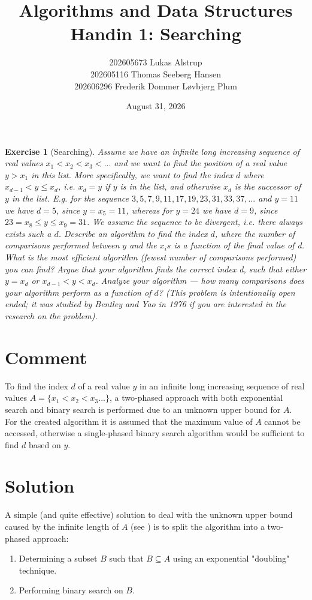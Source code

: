 \documentclass{article}
\title{Algorithms and Data Structures \\
  Handin 1: Searching}
\author{
    202605673 Lukas Alstrup \\
    202605116 Thomas Seeberg Hansen \\
    202606296 Frederik Dommer Løvbjerg Plum
}
\date{August 31, 2026}
\newtheorem*{exercise}{Exercise}
\begin{document}
\maketitle
\begin{exercise}[Searching]
	Assume we have an infinite long increasing sequence of real values $x_1 < x_2 < x_3 < ...$ and we want to find the position of a real value
	$y > x_1$ in this list. More specifically, we want to find the index $d$ where $x_{d - 1} < y \leq x_d$, i.e.
	$x_d = y$ if $y$ is in the list, and otherwise $x_d$ is the successor of $y$ in the list. E.g. for the sequence $3,
		5, 7, 9, 11, 17, 19, 23, 31, 33, 37, ...$ and $y = 11$ we have $d = 5$, since $y = x_5 = 11$, whereas for $y = 24$
	we have $d = 9$, since $23 = x_8 \leq y \leq x_9 = 31$. We assume the sequence to be divergent, i.e. there
	always exists such a $d$.
	Describe an algorithm to find the index $d$, where the number of comparisons performed
	between $y$ and the $x_is$ is a function of the final value of d. What is the most efficient algorithm
	(fewest number of comparisons performed) you can find? Argue that your algorithm finds the
	correct index d, such that either $y = x_d$ or $x_{d - 1} < y < x_d$. Analyze your algorithm — how many
	comparisons does your algorithm perform as a function of $d$?
	(This problem is intentionally open ended; it was studied by Bentley and Yao in 1976 \cite{BENTLEY197682} if
	you are interested in the research on the problem).
\end{exercise}

\section*{Comment}
\label{sec:comment}
To find the index $d$ of a real value $y$ in an infinite long increasing sequence of real values $A=\{x_1 < x_2<x_3...\}$, a two-phased approach with both exponential search and binary search is performed due to an unknown upper bound for $A$. For the created algorithm it is assumed that the maximum value of $A$ cannot be accessed, otherwise a single-phased binary search algorithm would be sufficient to find $d$ based on $y$.

\section*{Solution}
A simple (and quite effective) solution to deal with the unknown upper bound caused by the infinite length of $A$ (see ) is to split the algorithm into a two-phased approach:
\begin{enumerate}
	\item Determining a subset $B$ such that $B \subseteq A$ using an exponential "doubling" technique.
	\item Performing binary search on $B$.
\end{enumerate}
\end{document}
